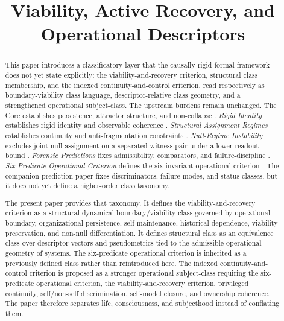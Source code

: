 \documentclass[11pt,a4paper]{article}
\title{\textbf{Viability, Active Recovery, and Operational Descriptors}}
\author{\AuthorVisible}
\date{}
\theoremstyle{definition}
\begin{document}
\setlength{\emergencystretch}{3em}
\maketitle

\begin{abstract}
This paper introduces a classificatory layer that the causally rigid formal framework does not yet state explicitly: the viability-and-recovery criterion, structural class membership, and the indexed continuity-and-control criterion, read respectively as boundary-viability class language, descriptor-relative class geometry, and a strengthened operational subject-class. The upstream burdens remain unchanged. The Core establishes persistence, attractor structure, and non-collapse \cite{core}. \textit{Rigid Identity} establishes rigid identity and observable coherence \cite{paper1}. \textit{Structural Assignment Regimes} establishes continuity and anti-fragmentation constraints \cite{paper2}. \textit{Null-Regime Instability} excludes joint null assignment on a separated witness pair under a lower readout bound \cite{paper3}. \textit{Forensic Predictions} fixes admissibility, comparators, and failure-discipline \cite{paper4}. \textit{Six-Predicate Operational Criterion} defines the six-invariant operational criterion \cite{paper5}. The companion prediction paper fixes discriminators, failure modes, and status classes, but it does not yet define a higher-order class taxonomy.

The present paper provides that taxonomy. It defines the viability-and-recovery criterion as a structural-dynamical boundary/viability class governed by operational boundary, organizational persistence, self-maintenance, historical dependence, viability preservation, and non-null differentiation. It defines structural class as an equivalence class over descriptor vectors and pseudometrics tied to the admissible operational geometry of systems. The six-predicate operational criterion is inherited as a previously defined class rather than reintroduced here. The indexed continuity-and-control criterion is proposed as a stronger operational subject-class requiring the six-predicate operational criterion, the viability-and-recovery criterion, privileged continuity, self/non-self discrimination, self-model closure, and ownership coherence. The paper therefore separates life, consciousness, and subjecthood instead of conflating them.


\end{abstract}
\end{document}
